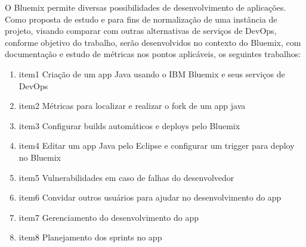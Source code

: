 O Bluemix permite diversas possibilidades de desenvolvimento de aplicações. Como proposta de estudo e para fins de normalização de uma instância de projeto, visando comparar com outras alternativas de serviços de DevOps, conforme objetivo do trabalho, serão desenvolvidos no contexto do Bluemix, com documentação e estudo de métricas nos pontos aplicáveis, os seguintes trabalhos:
\begin{enumerate}
    \item item1	Criação de um app Java usando o IBM Bluemix e seus serviços de DevOps
    \item item2	Métricas para localizar e realizar o fork de um app java
    \item item3	Configurar builds automáticos e deploys pelo Bluemix
    \item item4	Editar um app Java pelo Eclipse e configurar um trigger para deploy no Bluemix
    \item item5	Vulnerabilidades em caso de falhas do desenvolvedor
    \item item6	Convidar outros usuários para ajudar no desenvolvimento do app
    \item item7	Gerenciamento do desenvolvimento do app
    \item item8	Planejamento dos sprints no app
\end{enumerate}
